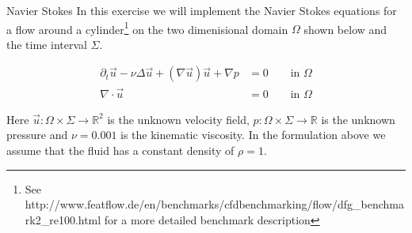 \documentclass[12pt,a4paper]{article}
\newcommand{\Laplace}{\Delta}
\begin{document}
\begin{Exercise}{Navier Stokes}
  In this exercise we will implement the Navier Stokes equations for a flow
  around a cylinder\footnote{See
    http://www.featflow.de/en/benchmarks/cfdbenchmarking/flow/dfg\_benchmark2\_re100.html
    for a more detailed benchmark description} on the two dimenisional domain
  $\Omega$ shown below and the time interval $\Sigma$.

  \begin{equation}
    \begin{aligned}
      \partial_t \vec{u} - \nu \Laplace \vec{u} + (\nabla \vec{u}) \vec{u} + \nabla p &= 0 \qquad \text{in $\Omega$}\\
      \nabla \cdot \vec{u} &= 0 \qquad \text{in $\Omega$}
    \end{aligned}
    \label{eq:navier-stokes}
  \end{equation}

  Here $\vec{u}:\Omega\times\Sigma\to\mathbb{R}^2$ is the unknown velocity
  field, $p:\Omega\times\Sigma\to\mathbb{R}$ is the unknown pressure and
  $\nu=0.001$ is the kinematic viscosity. In the formulation above we assume
  that the fluid has a constant density of $\rho=1$.

  \begin{center}
  \end{center}


\end{Exercise}
\end{document}
